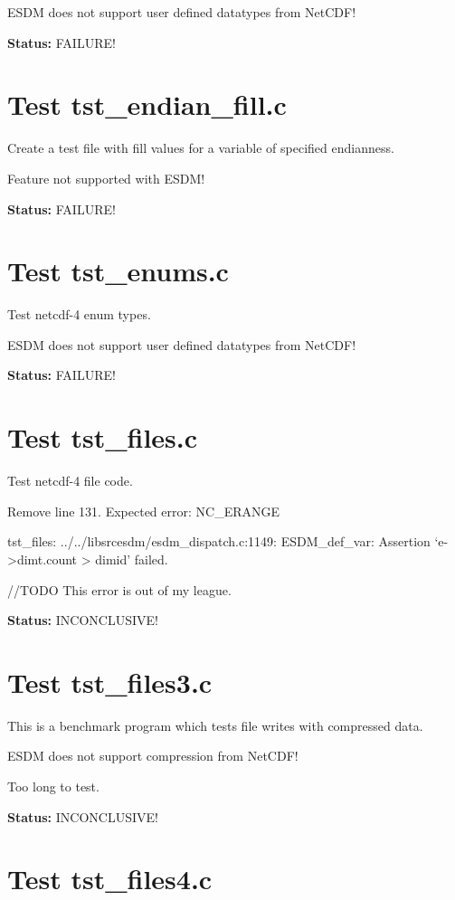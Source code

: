 ESDM does not support user defined datatypes from NetCDF!

{\bf \large Status: } FAILURE!

\section{Test tst\_endian\_fill.c}

Create a test file with fill values for a variable of specified endianness.

Feature not supported with ESDM!

{\bf \large Status: } FAILURE!

\section{Test tst\_enums.c}

Test netcdf-4 enum types.

ESDM does not support user defined datatypes from NetCDF!

{\bf \large Status: } FAILURE!

\section{Test tst\_files.c}

Test netcdf-4 file code.

Remove line 131. Expected error: NC\_ERANGE

tst\_files: ../../libsrcesdm/esdm\_dispatch.c:1149: ESDM\_def\_var: Assertion `e->dimt.count > dimid' failed.

//TODO This error is out of my league.

{\bf \large Status: } INCONCLUSIVE!

\section{Test tst\_files3.c}

This is a benchmark program which tests file writes with compressed data.

ESDM does not support compression from NetCDF!

Too long to test.

{\bf \large Status: } INCONCLUSIVE!

\section{Test tst\_files4.c}

